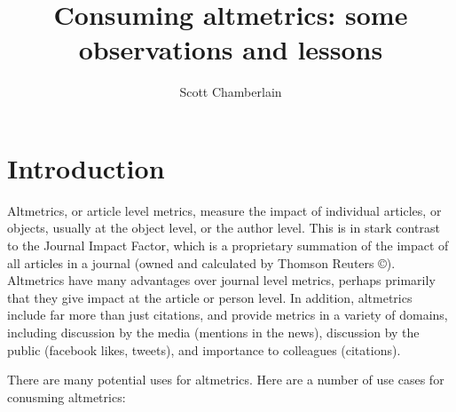 \documentclass[letterpaper,superscriptaddress,showkeys,longbibliography]{revtex4-1}\usepackage{graphicx, color}
\begin{document}

\title{Consuming altmetrics: some observations and lessons}

\author{Scott Chamberlain}


\maketitle

\section*{Introduction}

Altmetrics, or article level metrics, measure the impact of individual articles, or objects, usually at the object level, or the author level. This is in stark contrast to the Journal Impact Factor, which is a proprietary summation of the impact of all articles in a journal (owned and calculated by Thomson Reuters ©). Altmetrics have many advantages over journal level metrics, perhaps primarily that they give impact at the article or person level. In addition, altmetrics include far more than just citations, and provide metrics in a variety of domains, including discussion by the media (mentions in the news), discussion by the public (facebook likes, tweets), and importance to colleagues (citations). 

There are many potential uses for altmetrics. Here are a number of use cases for conusming altmetrics: 
\end{document}
